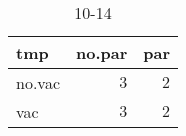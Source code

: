 %
\begin{table}[!tbp]
\caption{10-14\label{10-14}} 
\begin{center}
\begin{tabular}{lrr}
\hline\hline
\multicolumn{1}{l}{tmp}&\multicolumn{1}{c}{no.par}&\multicolumn{1}{c}{par}\tabularnewline
\hline
no.vac&$3$&$2$\tabularnewline
vac&$3$&$2$\tabularnewline
\hline
\end{tabular}
\end{center}
\end{table}

